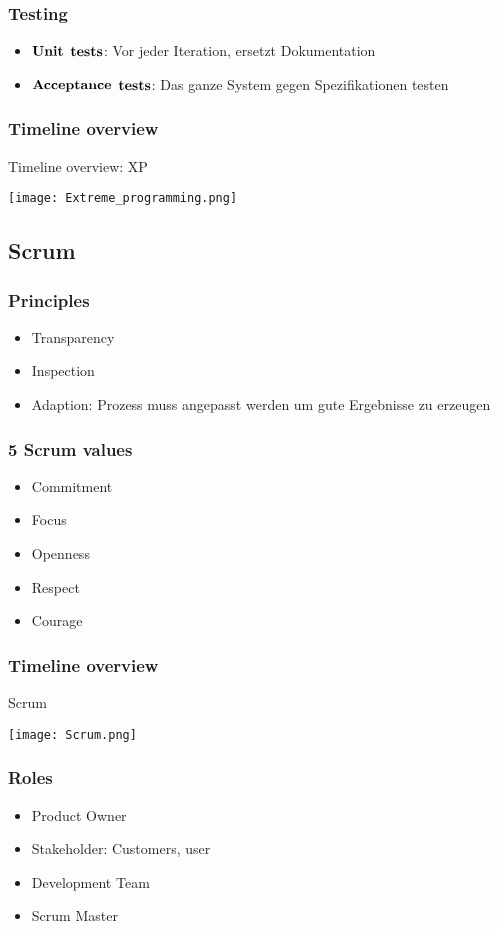 \subsubsection{Testing}
\begin{itemize}
	\item $\bold{Unit}$ $\bold{tests}$: Vor jeder Iteration, ersetzt Dokumentation
	\item $\bold{Acceptance}$ $\bold{tests}$: Das ganze System gegen Spezifikationen testen 
\end{itemize}
\subsubsection{Timeline overview}
\begin{table}[H]
\caption{Timeline overview: XP}
\texttt{[image: Extreme\_programming.png]}	
\end{table}
\subsection{Scrum}
\subsubsection{Principles}
\begin{itemize}
	\item Transparency 
	\item Inspection
	\item Adaption: Prozess muss angepasst werden um gute Ergebnisse zu erzeugen 
\end{itemize}
\subsubsection{5 Scrum values}
\begin{itemize}
	\item Commitment
	\item Focus
	\item Openness
	\item Respect
	\item Courage
\end{itemize}
\subsubsection{Timeline overview}
\begin{table}[H]
\caption{Scrum}
\texttt{[image: Scrum.png]}
\end{table}
\subsubsection{Roles}
\begin{itemize}
	\item Product Owner
	\item Stakeholder: Customers, user
	\item Development Team
	\item Scrum Master
\end{itemize}

